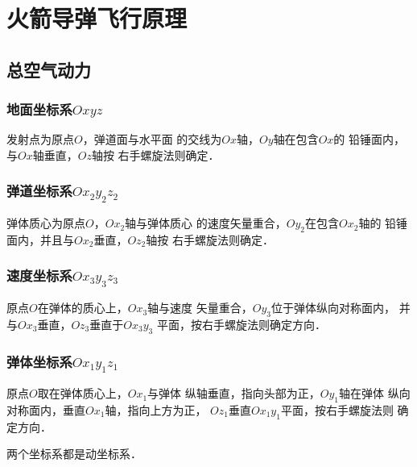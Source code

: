 
\chapter{火箭导弹飞行原理}
\section{总空气动力}
\subsection{地面坐标系$Oxyz $}
发射点为原点$O$，弹道面与水平面
的交线为$Ox$轴，$Oy$轴在包含$Ox$的
铅锤面内，与$Ox$轴垂直，$Oz$轴按
右手螺旋法则确定．
\subsection{弹道坐标系$Ox_2y_2z_2$}
弹体质心为原点$O$，$Ox_2$轴与弹体质心
的速度矢量重合，$Oy_2$在包含$Ox_2$轴的
铅锤面内，并且与$Ox_2$垂直，$Oz_2$轴按
右手螺旋法则确定．
\subsection{速度坐标系$Ox_3y_3z_3$}
原点$O$在弹体的质心上，$Ox_3$轴与速度
矢量重合，$Oy_3$位于弹体纵向对称面内，
并与$Ox_3$垂直，$Oz_3$垂直于$Ox_3y_3$
平面，按右手螺旋法则确定方向．
\subsection{弹体坐标系$Ox_1y_1z_1$}
原点$O$取在弹体质心上，$Ox_1$与弹体
纵轴垂直，指向头部为正，$Oy_1$轴在弹体
纵向对称面内，垂直$Ox_1$轴，指向上方为正，
$Oz_1$垂直$Ox_1y_1$平面，按右手螺旋法则
确定方向．

两个坐标系都是动坐标系．

